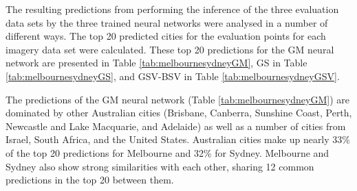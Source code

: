 \documentclass[sageh,times]{sagej}
\begin{document}
The resulting predictions from performing the inference of the three evaluation data sets by the three trained neural networks were analysed in a number of different ways. The top 20 predicted cities for the evaluation points for each imagery data set were calculated. These top 20 predictions for the GM neural network are presented in Table \ref{tab:melbournesydneyGM}, GS in Table \ref{tab:melbournesydneyGS}, and GSV-BSV in Table \ref{tab:melbournesydneyGSV}.

The predictions of the GM neural network (Table \ref{tab:melbournesydneyGM}) are dominated by other Australian cities (Brisbane, Canberra, Sunshine Coast, Perth, Newcastle and Lake Macquarie, and Adelaide) as well as a number of cities from Israel, South Africa, and the United States. Australian cities make up nearly 33\% of the top 20 predictions for Melbourne and 32\% for Sydney. Melbourne and Sydney also show strong similarities with each other, sharing 12 common predictions in the top 20 between them.
\end{document}
